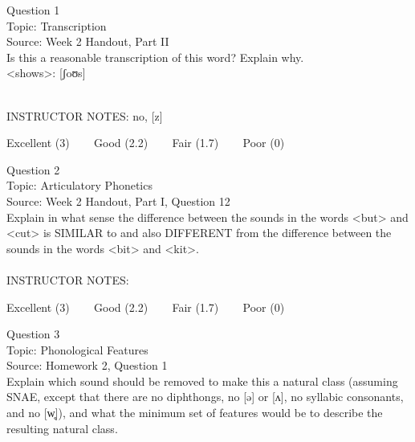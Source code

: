 \documentclass[12pt]{article}
\begin{document}
\begin{center}
\textbf{{\color{blue}{\HUGE START OF EXAM\\}}}

\textbf{{\color{blue}{\HUGE Student ID: 49816\\}}}

\textbf{{\color{blue}{\HUGE \\}}}

\end{center}
\newpage

{\large Question 1}\\

Topic: Transcription\\
Source: Week 2 Handout, Part II\\

Is this a reasonable transcription of this word? Explain why.\\

<shows>: {[ʃoʊs]}


~\\
INSTRUCTOR NOTES: no, [z]


\vfill
Excellent (3) ~~~ Good (2.2) ~~~ Fair (1.7) ~~~ Poor (0)
\newpage

{\large Question 2}\\

Topic: Articulatory Phonetics\\
Source: Week 2 Handout, Part I, Question 12\\

Explain in what sense the difference between the sounds in the words <but> and <cut> is SIMILAR to and also DIFFERENT from the difference between the sounds in the words <bit> and <kit>.\\


~\\
INSTRUCTOR NOTES: 


\vfill
Excellent (3) ~~~ Good (2.2) ~~~ Fair (1.7) ~~~ Poor (0)
\newpage

{\large Question 3}\\

Topic: Phonological Features\\
Source: Homework 2, Question 1\\

Explain which sound should be removed to make this a natural class (assuming SNAE, except that there are no diphthongs, no [ə] or [ʌ], no syllabic consonants, and no [w̥]), and what the minimum set of features would be to describe the resulting natural class.\\
\end{document}
